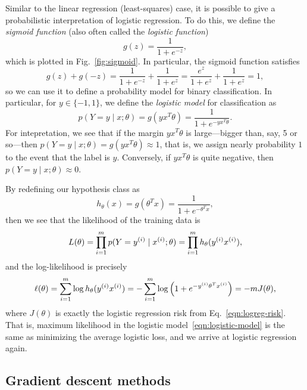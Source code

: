 \documentclass{article}
\begin{document}
Similar to the linear regression (least-squares) case, it
is possible to give a probabilistic interpretation of logistic
regression. To do this, we define the \emph{sigmoid function}
(also often called the \emph{logistic function})
\begin{equation*}
  g(z) = \frac{1}{1 + e^{-z}},
\end{equation*}
which is plotted in Fig.~\ref{fig:sigmoid}. In particular,
the sigmoid function satisfies
\begin{equation*}
  g(z) + g(-z) = \frac{1}{1 + e^{-z}} + \frac{1}{1 + e^z}
  = \frac{e^z}{1 + e^z} + \frac{1}{1 + e^z} = 1,
\end{equation*}
so we can use it to define a probability model for binary classification.
In particular, for $y \in \{-1, 1\}$, we define the \emph{logistic
model} for classification as
\begin{equation}
  \label{eqn:logistic-model}
  p(Y = y \mid x; \theta)
  = g(y x^T \theta)
  = \frac{1}{1 + e^{-y x^T \theta}}.
\end{equation}
For intepretation, we see that if the margin
$y x^T \theta$ is large---bigger than, say, 5 or so---then
$p(Y = y \mid x; \theta) = g(y x^T \theta) \approx 1$, that is, 
we assign nearly probability $1$ to the event that the label is $y$.
Conversely, if $y x^T \theta$ is quite negative, then
$p(Y = y \mid x; \theta) \approx 0$.

By redefining our hypothesis class as
\begin{equation*}
  h_\theta(x) = g(\theta^T x) = \frac{1}{1 + e^{-\theta^T x}},
\end{equation*}
then we see that the likelihood of the training data is
\begin{equation*}
  L(\theta)
  = \prod_{i = 1}^m p(Y = {y^{(i)}} \mid {x^{(i)}}; \theta)
  = \prod_{i = 1}^m h_\theta({y^{(i)}} {x^{(i)}}),
\end{equation*}
and the log-likelihood is precisely
\begin{equation*}
  \ell(\theta)
  = \sum_{i = 1}^m \log h_\theta({y^{(i)}} {x^{(i)}})
  = -\sum_{i = 1}^m \log\left(1 + e^{-{y^{(i)}} \theta^T {x^{(i)}}}\right)
  = - m J(\theta),
\end{equation*}
where $J(\theta)$ is exactly the logistic regression
risk from Eq.~\eqref{eqn:logreg-risk}. That is, maximum likelihood
in the logistic model~\eqref{eqn:logistic-model} is the same
as minimizing the average logistic loss, and we arrive at logistic
regression again.

\subsection{Gradient descent methods}
\end{document}
